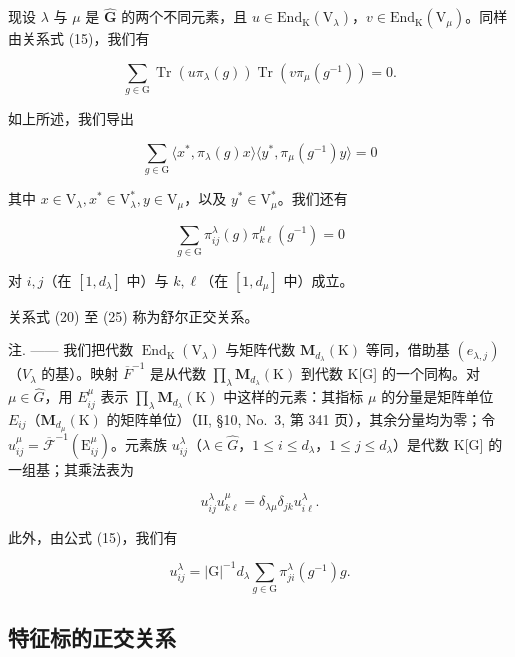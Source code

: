 现设 \(\lambda\) 与 \(\mu\) 是 \(\widehat{\mathbf{G}}\) 的两个不同元素，且 \(u \in \mathrm{End}_{\mathrm{K}}(\mathrm{V}_{\lambda})\)，\(v \in \mathrm{End}_{\mathrm{K}}(\mathrm{V}_{\mu})\)。同样由关系式 (15)，我们有

\[
\sum_ {g \in \mathrm{G}} \operatorname{Tr} (u \pi_ {\lambda} (g)) \operatorname{Tr} (v \pi_ {\mu} (g ^ {- 1})) = 0.\tag{23}
\]

如上所述，我们导出

\[
\sum_ {g \in \mathrm{G}} \langle x ^ {*}, \pi_ {\lambda} (g) x \rangle \langle y ^ {*}, \pi_ {\mu} (g ^ {- 1}) y \rangle = 0\tag{24}
\]

其中 \(x\in \mathrm{V}_{\lambda},x^{*}\in \mathrm{V}_{\lambda}^{*},y\in \mathrm{V}_{\mu}\)，以及 \(y^{*}\in \mathrm{V}_{\mu}^{*}\)。我们还有

\[
\sum_ {g \in \mathrm{G}} \pi_ {i j} ^ {\lambda} (g) \pi_ {k \ell} ^ {\mu} (g ^ {- 1}) = 0\tag{25}
\]

对 \(i,j\)（在 \([1,d_{\lambda}]\) 中）与 \(k,\ell\)（在 \([1,d_{\mu}]\) 中）成立。

关系式 (20) 至 (25) 称为舒尔正交关系。

注. —— 我们把代数 \(\operatorname{End}_{\mathrm{K}}(\mathrm{V}_{\lambda})\) 与矩阵代数 \(\mathbf{M}_{d_{\lambda}}(\mathrm{K})\) 等同，借助基 \((e_{\lambda,j})\)（\(V_{\lambda}\) 的基）。映射 \(\overline{F}^{-1}\) 是从代数 \(\prod_{\lambda}\mathbf{M}_{d_{\lambda}}(\mathrm{K})\) 到代数 K{[}G{]} 的一个同构。对 \(\mu\in\widehat{G}\)，用 \(E_{ij}^{\mu}\) 表示 \(\prod_{\lambda}\mathbf{M}_{d_{\lambda}}(\mathrm{K})\) 中这样的元素：其指标 \(\mu\) 的分量是矩阵单位 \(E_{ij}\)（\(\mathbf{M}_{d_{\mu}}(\mathrm{K})\) 的矩阵单位）（II, §10, No.~3, 第 341 页），其余分量均为零；令 \(u_{ij}^{\mu}=\overline{\mathcal{F}}^{-1}(\mathrm{E}_{ij}^{\mu})\)。元素族 \(u_{ij}^{\lambda}\)（\(\lambda\in\widehat{G}\)，\(1\leqslant i\leqslant d_{\lambda}\)，\(1\leqslant j\leqslant d_{\lambda}\)）是代数 K{[}G{]} 的一组基；其乘法表为

\[
u _ {i j} ^ {\lambda} u _ {k \ell} ^ {\mu} = \delta_ {\lambda \mu} \delta_ {j k} u _ {i \ell} ^ {\lambda}.\tag{26}
\]

此外，由公式 (15)，我们有

\[
u _ {i j} ^ {\lambda} = | \mathrm{G} | ^ {- 1} d _ {\lambda} \sum_ {g \in \mathrm{G}} \pi_ {j i} ^ {\lambda} (g ^ {- 1}) g.\tag{27}
\]

\subsection{特征标的正交关系}


